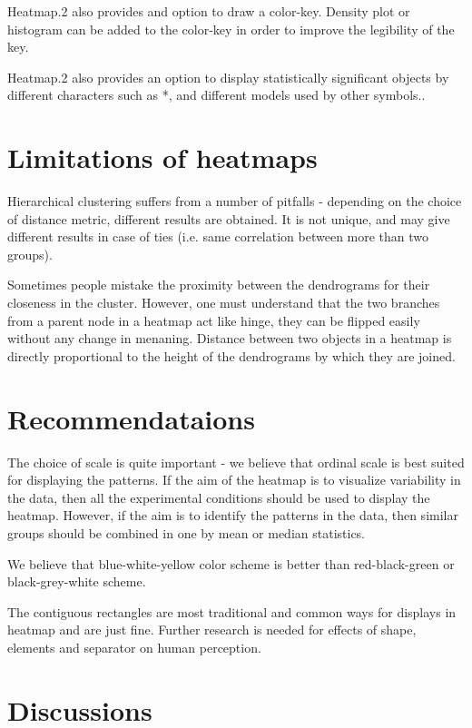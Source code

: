 \documentclass[12pt, oneside, letterpaper]{article}
\begin{document}
Heatmap.2 also provides and option to draw a color-key. Density plot
or histogram can be added to the color-key in order to improve the
legibility of the key.

Heatmap.2 also provides an option to display statistically
significant objects by different characters such as *, and different
models used by other symbols..
	



\section*{Limitations of heatmaps}
	Hierarchical clustering suffers from a number of pitfalls -
	depending on the choice of distance metric, different
	results are obtained. It is not unique, and may give
	different results in case of ties (i.e. same correlation
	between more than two groups).

	Sometimes people mistake the proximity between the
	dendrograms for their closeness in the cluster. However, one
	must understand that the two branches from a parent node in
	a heatmap act like hinge, they can be flipped easily without
	any change in menaning. Distance between two objects in a
	heatmap is directly proportional to the height of the
	dendrograms by which they are joined.


\section*{Recommendataions}

	The choice of scale is quite important - we believe that
	ordinal scale is best suited for displaying the patterns. If
	the aim of the heatmap is to visualize variability in the
	data, then all the experimental conditions should be used to
	display the heatmap. However, if the aim is to identify the
	patterns in the data, then similar groups should be combined
	in one by mean or median statistics.

   	We believe that blue-white-yellow color scheme
   	is better than red-black-green or black-grey-white
   	scheme. 

	The contiguous rectangles are most traditional and common
	ways for displays in heatmap and are just fine. Further
	research is needed for effects of shape, elements and
	separator on human perception.


\section*{Discussions}
\end{document}
